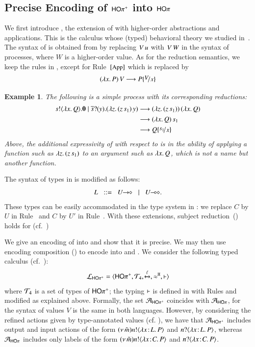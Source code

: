 \documentclass[preprint,11pt]{elsarticle}
\newtheorem{example}{Example}[section]
\begin{document}
{%
\subsection{Precise Encoding of $\mathsf{HO\pi^{+}}$ into $\mathsf{HO}\pi$}
We first introduce \HOpp, the  extension of \HOp with higher-order abstractions and applications.
This is the calculus whose (typed) behavioral theory we studied in~\cite{characteristic_bis,KouzapasPY17}. The syntax of \HOpp is obtained 
from   by replacing 
$V\, {u}$ with  $V\, {W}$ in the syntax of processes, where  $W$ is a higher-order value. 
As for the reduction semantics, we keep the rules in , except for 
 Rule~${\scriptsize{[\textrm{\small App}]}}$ which is replaced by 
$$
	\appl{(\abs{x}{P})}{V} \red P \subst{V}{x}
$$

\begin{example}\label{ex:hopp}
The following is a simple \HOpp process with its corresponding reductions:
\begin{align*}
\bout{s}{\abs{x}{Q}}\inact  \Par \binp{\dual{s}}{y}(\appl{\abs{z}{(\appl{z}{s_1}})}{y}) 
& \red 
\appl{(\abs{z}{(\appl{z}{s_1}}))}{(\abs{x}{Q})}
\\
& \red 
\appl{(\abs{x}{Q})}{s_1}
\\
& \red Q\subst{s_1}{x}
\end{align*}
Above, the additional expressivity of \HOpp with respect to \HOp is in the ability of applying a function such as 
$\lambda z.\,(z\, {s_1})$ to an argument such as $\lambda x.\,Q$, which is not a name but another function.
\end{example}


		The syntax of types in  is modified as follows: %
$$
		L \bnfis \shot{U} \bnfbar \lhot{U}.
$$
These types can be easily accommodated in the type system 
in :
we replace $C$ by $U$ in Rule~ and $C$ by $U'$ in Rule~. 
With these extensions, subject
reduction~() holds for \HOpp (cf.~\cite{characteristic_bis})

We give  %
an encoding of \HOpp into \HOp and show that it is precise. 
We may then use encoding composition () to encode
\HOpp into \HO and \sessp.
We consider the following 
typed calculus (cf.~):
$$\mathcal{L}_{\mathsf{HO\pi^{+}}}=\langle \mathsf{HO\pi^{+}}, {\cal{T}}_4, \xmapsto{\ell}, \approx^\mathtt{H}, \vdash \rangle$$
where 
	${\cal{T}}_4$ is a set of types of $\mathsf{HO\pi^{+}}$;  
the typing $\vdash$ is defined in 
with Rules  and  modified as explained above.
Formally, the set   
$\mathcal{A}_\mathsf{HO\pi^{+}}$ coincides with $\mathcal{A}_{\mathsf{HO}\pi}$, for the syntax of values $V$ is the same in both languages.
However, by considering the refined actions given by type-annotated values (cf. ),
we have that   $\mathcal{A}_\mathsf{HO\pi^{+}}$
includes output and input actions of the form
$(\nu\, \tilde{m}) n ! \langle \lambda x \! : \! L.\,P \rangle$
and
${n ? \langle \lambda x \! : \! L.\,P \rangle}$, whereas $\mathcal{A}_{\mathsf{HO}\pi}$ includes only labels of the form
$(\nu\, \tilde{m}) n ! \langle \lambda x \! : \! C.\,P \rangle$
and
${n ? \langle \lambda x \! : \! C.\,P \rangle}$.

}
\end{document}
